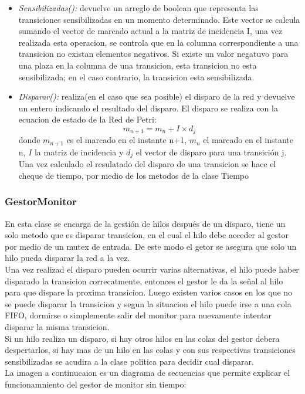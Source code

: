 \documentclass[10pt, a4paper,notitlepage]{article}
\begin{document}
\begin{itemize}
	\item \textit{Sensibilizadas():} devuelve un arreglo de boolean que representa las transiciones sensibilizadas en un momento determinado. Este vector se calcula sumando el vector de marcado actual a la matriz de incidencia I, una vez realizada esta operacion, se controla que en la columna correspondiente a una transicion no existan elementos negativos. Si existe un valor negatuvo para una plaza en la columna de una transicion, esta transicion no esta sensibilizada; en el caso contrario, la transicion esta sensibilizada.
	\item \textit{Disparar():} realiza(en el caso que sea posible) el disparo de la red y devuelve un entero indicando el resultado del disparo. El disparo se realiza con la ecuacion de estado de la Red de Petri:
	\begin{equation*}
	m_{n+1} = m_n + I \times d_j
	\end{equation*}
	donde $ m_{n+1} $ es el marcado en el instante n+1, $m_n$ el marcado en el instante n, $I$ la matriz de incidencia y $d_j$ el vector de disparo para una transición j.\\
	Una vez calculado el resulatado del disparo de una transicion se hace el cheque de tiempo, por medio de los metodos de la clase Tiempo
	
\end{itemize}

\subsubsection{GestorMonitor}
En esta clase se encarga de la gestión de hilos después de un disparo, tiene un solo metodo que es disparar transicion, en el cual el hilo debe acceder al gestor por medio de un mutex de entrada. De este modo el getor se asegura que solo un hilo pueda disparar la red a la vez.
\\
Una vez realizad el disparo pueden ocurrir varias alternativas, el hilo puede haber disparado la transicion correcatmente, entonces el gestor le da la señal al hilo para que dispare la proxima transicion. Luego existen varios casos en los que no se puede disparar la transicion y segun la situacion el hilo puede irse a una cola FIFO, dormirse o simplemente salir del monitor para nuevamente intentar disparar la misma transicion.
\\
Si un hilo realiza un disparo, si hay otros hilos en las colas del gestor debera despertarlos, si hay mas de un hilo en las colas y con sus respectivas transiciones sensibilizadas se acudira a la clase politica para decidir cual disparar.
\\
La imagen a continucaion es un diagrama de secuencias que permite explicar el funcionamniento del gestor de monitor sin tiempo:
\end{document}
